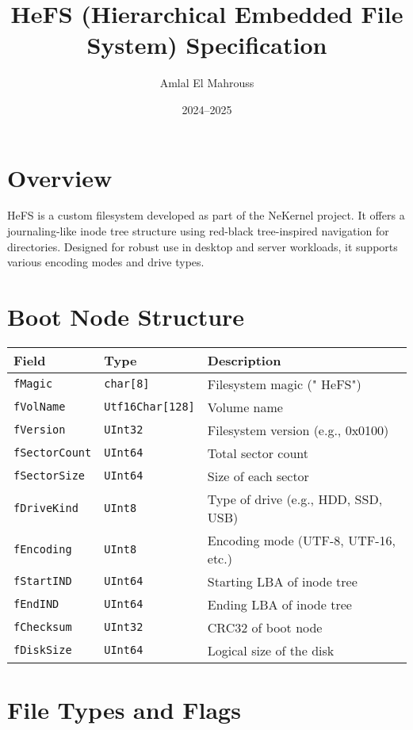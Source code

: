 \documentclass{article}
\title{HeFS (Hierarchical Embedded File System) Specification}
\author{Amlal El Mahrouss}
\date{2024–2025}
\begin{document}
\maketitle

\section{Overview}
HeFS is a custom filesystem developed as part of the NeKernel project. It offers a journaling-like inode tree structure using red-black tree-inspired navigation for directories. Designed for robust use in desktop and server workloads, it supports various encoding modes and drive types.

\section{Boot Node Structure}
\begin{longtable}{|l|l|p{8cm}|}
\hline
\textbf{Field} & \textbf{Type} & \textbf{Description} \\
\hline
\verb|fMagic| & \verb|char[8]| & Filesystem magic ("  HeFS") \\
\verb|fVolName| & \verb|Utf16Char[128]| & Volume name \\
\verb|fVersion| & \verb|UInt32| & Filesystem version (e.g., 0x0100) \\
\verb|fSectorCount| & \verb|UInt64| & Total sector count \\
\verb|fSectorSize| & \verb|UInt64| & Size of each sector \\
\verb|fDriveKind| & \verb|UInt8| & Type of drive (e.g., HDD, SSD, USB) \\
\verb|fEncoding| & \verb|UInt8| & Encoding mode (UTF-8, UTF-16, etc.) \\
\verb|fStartIND| & \verb|UInt64| & Starting LBA of inode tree \\
\verb|fEndIND| & \verb|UInt64| & Ending LBA of inode tree \\
\verb|fChecksum| & \verb|UInt32| & CRC32 of boot node \\
\verb|fDiskSize| & \verb|UInt64| & Logical size of the disk \\
\hline
\end{longtable}

\section{File Types and Flags}
\end{document}
